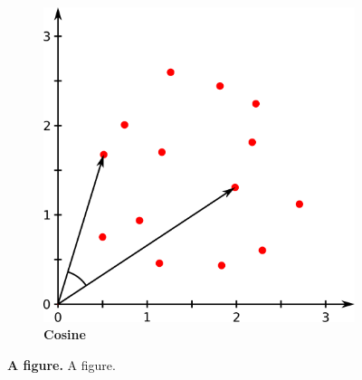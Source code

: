\begin{figure}
\begin{adjustbox}{minipage=\dimexpr{}\fboxrule,fbox}
\begin{subfigure}[b]{0.475\textwidth}
            \includegraphics[width=\textwidth]{Extra_Graphics/Cosinus.pdf}
            \caption[Cosine]{\textbf{Cosine}}
            \label{fig:1.0.2b}
        \end{subfigure}
    \end{adjustbox}
    \caption[A figure]{\textbf{A figure.} A figure.}
    \label{fig:1.0.2}
\end{figure}

